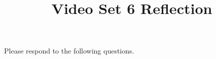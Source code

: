 \documentclass[handout]{ximera}
\title{Video Set 6 Reflection}
\begin{document}
\begin{abstract}
\end{abstract}

\maketitle

Please respond to the following questions.

\end{document}
